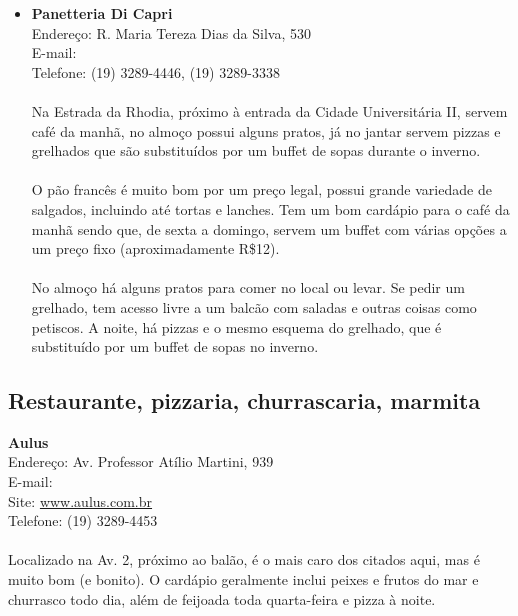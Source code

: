 \begin{itemize}
\item \textbf{Panetteria Di Capri}
  \\Endereço: R. Maria Tereza Dias da Silva, 530
  \\E-mail: 
  \\Telefone: (19) 3289-4446, (19) 3289-3338
  \\
  \\Na Estrada da Rhodia, próximo à entrada da Cidade Universitária II, servem
  café da manhã, no almoço possui alguns pratos, já no jantar servem pizzas e
  grelhados que são substituídos por um buffet de sopas durante o inverno.
  \\
  \\O pão francês é muito bom por um preço legal, possui grande variedade de
  salgados, incluindo até tortas e lanches. Tem um bom cardápio para o café da
  manhã sendo que, de sexta a domingo, servem um buffet com várias opções a um
  preço fixo (aproximadamente R\$12).
  \\
  \\No almoço há alguns pratos para comer no local ou levar. Se pedir um
  grelhado, tem acesso livre a um balcão com saladas e outras coisas como
  petiscos. A noite, há pizzas e o mesmo esquema do grelhado, que é substituído
  por um buffet de sopas no inverno.
\end{itemize}

\subsection{Restaurante, pizzaria, churrascaria, marmita}

\begin{itemsize}
\item \textbf{Aulus}
  \\Endereço: Av. Professor Atílio Martini, 939
  \\E-mail: 
  \\Site: \url{www.aulus.com.br}
  \\Telefone: (19) 3289-4453
  \\
  \\Localizado na Av. 2, próximo ao balão, é o mais caro dos citados aqui, mas é
  muito bom (e bonito). O cardápio geralmente inclui peixes e frutos do mar e
  churrasco todo dia, além de feijoada toda quarta-feira e pizza à noite.
\end{itemsize}

